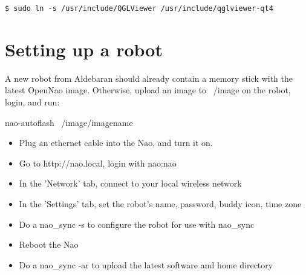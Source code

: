 \documentclass[pdftex,11pt,a4paper]{report}
\begin{document}
\texttt{\$ sudo ln -s /usr/include/QGLViewer /usr/include/qglviewer-qt4}

\section{Setting up a robot}

A new robot from Aldebaran should already contain a memory stick with the latest OpenNao image. Otherwise, upload an image to ~/image on the robot, login, and run: 

nao-autoflash ~/image/imagename 

\begin{itemize}
  \item{Plug an ethernet cable into the Nao, and turn it on.}
  \item{Go to http://nao.local, login with nao:nao}
  \item{In the 'Network' tab, connect to your local wireless network}
  \item{In the 'Settings' tab, set the robot's name, password, buddy icon, time zone}
  \item{Do a nao\_sync -s to configure the robot for use with nao\_sync}
  \item{Reboot the Nao}
  \item{Do a nao\_sync -ar to upload the latest software and home directory}
\end{itemize}

\newpage


\end{document}
